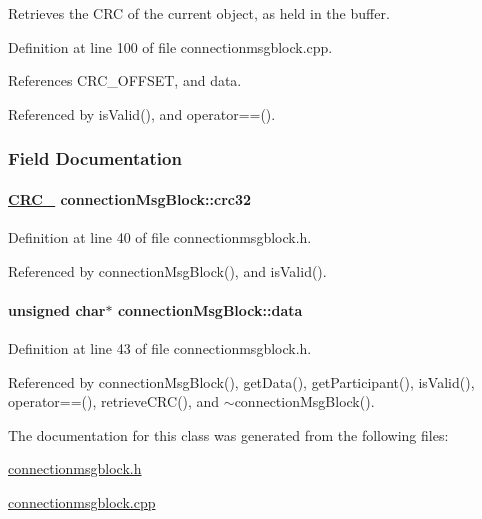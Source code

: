 Retrieves the CRC of the current object, as held in the buffer. 

Definition at line 100 of file connectionmsgblock.cpp.

References CRC\_\-OFFSET, and data.

Referenced by is\-Valid(), and operator==().

\subsubsection{Field Documentation}
\hypertarget{classconnectionMsgBlock_connectionMsgBlocko0}{
\paragraph[crc32]{\setlength{\rightskip}{0pt plus 5cm}\hyperlink{classCRC__32}{CRC\_} connection\-Msg\-Block::crc32}\hfill}
\label{classconnectionMsgBlock_connectionMsgBlocko0}




Definition at line 40 of file connectionmsgblock.h.

Referenced by connection\-Msg\-Block(), and is\-Valid().\hypertarget{classconnectionMsgBlock_connectionMsgBlocko1}{
\paragraph[data]{\setlength{\rightskip}{0pt plus 5cm}unsigned char$\ast$ connection\-Msg\-Block::data}\hfill}
\label{classconnectionMsgBlock_connectionMsgBlocko1}




Definition at line 43 of file connectionmsgblock.h.

Referenced by connection\-Msg\-Block(), get\-Data(), get\-Participant(), is\-Valid(), operator==(), retrieve\-CRC(), and $\sim$connection\-Msg\-Block().

The documentation for this class was generated from the following files:\begin{CompactItemize}
\item 
\hyperlink{connectionmsgblock_8h}{connectionmsgblock.h}\item 
\hyperlink{connectionmsgblock_8cpp}{connectionmsgblock.cpp}\end{CompactItemize}
